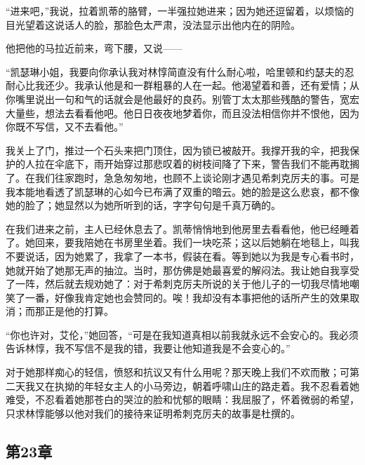 \par “进来吧，”我说，拉着凯蒂的胳臂，一半强拉她进来；因为她还逗留着，以烦恼的目光望着这说话人的脸，那脸色太严肃，没法显示出他内在的阴险。
\par 他把他的马拉近前来，弯下腰，又说——
\par “凯瑟琳小姐，我要向你承认我对林惇简直没有什么耐心啦，哈里顿和约瑟夫的忍耐心比我还少。我承认他是和一群粗暴的人在一起。他渴望着和善，还有爱情；从你嘴里说出一句和气的话就会是他最好的良药。别管丁太太那些残酷的警告，宽宏大量些，想法去看看他吧。他日日夜夜地梦着你，而且没法相信你并不恨他，因为你既不写信，又不去看他。”
\par 我关上了门，推过一个石头来把门顶住，因为锁已被敲开。我撑开我的伞，把我保护的人拉在伞底下，雨开始穿过那悲叹着的树枝间降了下来，警告我们不能再耽搁了。在我们往家跑时，急急匆匆地，也顾不上谈论刚才遇见希刺克厉夫的事。可是我本能地看透了凯瑟琳的心如今已布满了双重的暗云。她的脸是这么悲哀，都不像她的脸了；她显然以为她所听到的话，字字句句是千真万确的。
\par 在我们进来之前，主人已经休息去了。凯蒂悄悄地到他房里去看看他，他已经睡着了。她回来，要我陪她在书房里坐着。我们一块吃茶；这以后她躺在地毯上，叫我不要说话，因为她累了，我拿了一本书，假装在看。等到她以为我是专心看书时，她就开始了她那无声的抽泣。当时，那仿佛是她最喜爱的解闷法。我让她自我享受了一阵，然后就去规劝她了：对于希刺克厉夫所说的关于他儿子的一切我尽情地嘲笑了一番，好像我肯定她也会赞同的。唉！我却没有本事把他的话所产生的效果取消；而那正是他的打算。
\par “你也许对，艾伦，”她回答，“可是在我知道真相以前我就永远不会安心的。我必须告诉林惇，我不写信不是我的错，我要让他知道我是不会变心的。”
\par 对于她那样痴心的轻信，愤怒和抗议又有什么用呢？那天晚上我们不欢而散；可第二天我又在执拗的年轻女主人的小马旁边，朝着呼啸山庄的路走着。我不忍看着她难受，不忍看着她那苍白的哭泣的脸和忧郁的眼睛：我屈服了，怀着微弱的希望，只求林惇能够以他对我们的接待来证明希刺克厉夫的故事是杜撰的。


\subsection{第23章}

